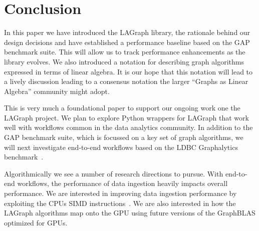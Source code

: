 \section{Conclusion}
\label{sec:conclusion}

In this paper we have introduced the LAGraph library, the rationale behind our design decisions 
and have established a performance baseline based on the GAP benchmark suite.  This will 
allow us to track performance enhancements as the library evolves.  We also introduced
a notation for describing graph algorithms expressed in terms of linear algebra.  It is our hope that this
notation will lead to a lively discussion leading to a consensus notation the 
larger ``Graphs as Linear Algebra'' community might adopt.

This is very much a foundational paper to support our ongoing work one the LAGraph project.  
We plan to explore Python wrappers for LAGraph that work well with workflows common in the data analytics community.  
In addition to the GAP benchmark suite, which is focussed on a key set of graph algorithms, we will next 
investigate end-to-end workflows based on the LDBC Graphalytics benchmark~\cite{DBLP:journals/pvldb/IosupHNHPMCCSAT16}.

Algorithmically we see a number of research directions to pursue.   With end-to-end workflows, the performance
of data ingestion heavily impacts overall performance.  We are interested in improving data ingestion performance
by exploiting the CPUs SIMD instructions~\cite{DBLP:journals/vldb/LangdaleL19}.  We are also interested in how 
the LAGraph algorithms map onto the GPU using future versions of the GraphBLAS optimized for GPUs.